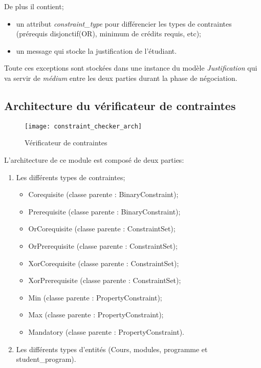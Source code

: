 De plus il contient;
\begin{itemize}
\item un attribut \textit{constraint\_type} pour différencier les types de contraintes (prérequis disjonctif(OR), minimum de crédits requis, etc);
\item un message qui stocke la justification de l'étudiant.
\end{itemize}

Toute ces exceptions sont stockées dans une instance du modèle \textit{Justification} qui va servir de \textit{médium} entre les deux parties durant la phase de négociation.

\subsection{Architecture du vérificateur de contraintes}
\label{constraintchecker}
\begin{figure}[H]
\centering
\caption{Vérificateur de contraintes}
\label{fig:constraint_checker_arch}
\texttt{[image: constraint\_checker\_arch]}
\end{figure}

L'architecture de ce module est composé de deux parties:
\begin{enumerate}
  \item Les différents types de contraintes;
    \begin{itemize}
    \item Corequisite (classe parente : BinaryConstraint);
    \item Prerequisite (classe parente : BinaryConstraint);
    \item OrCorequisite (classe parente : ConstraintSet);
    \item OrPrerequisite (classe parente : ConstraintSet);
    \item XorCorequisite (classe parente : ConstraintSet);
    \item XorPrerequisite (classe parente : ConstraintSet);
    \item Min (classe parente : PropertyConstraint);
    \item Max (classe parente : PropertyConstraint);
    \item Mandatory (classe parente : PropertyConstraint).
    \end{itemize} 
  \item Les différents types d'entités (Cours, modules, programme et student\_program).
\end{enumerate}

